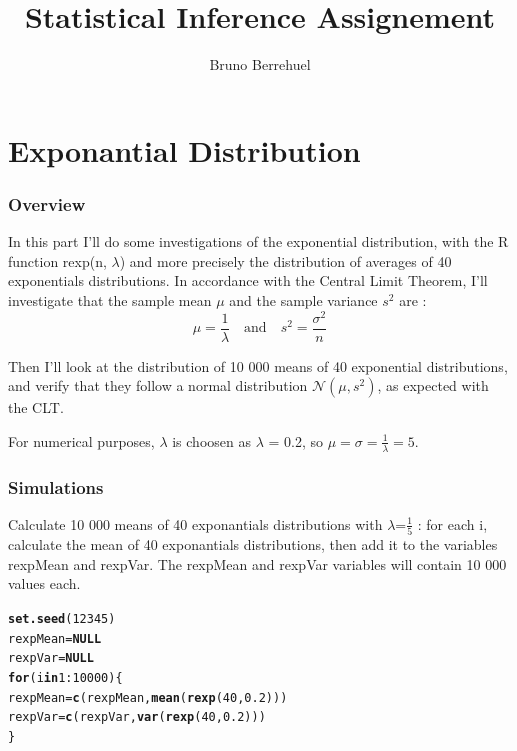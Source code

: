 \documentclass[a4paper, 10pt]{article}\usepackage[]{graphicx}\usepackage[]{color}
\makeatletter
\newcommand{\hlnum}[1]{\textcolor[rgb]{0.686,0.059,0.569}{#1}}%
\newcommand{\hlopt}[1]{\textcolor[rgb]{0,0,0}{#1}}%
\newcommand{\hlstd}[1]{\textcolor[rgb]{0.345,0.345,0.345}{#1}}%
\newcommand{\hlkwa}[1]{\textcolor[rgb]{0.161,0.373,0.58}{\textbf{#1}}}%
\newcommand{\hlkwb}[1]{\textcolor[rgb]{0.69,0.353,0.396}{#1}}%
\newcommand{\hlkwd}[1]{\textcolor[rgb]{0.737,0.353,0.396}{\textbf{#1}}}%
\newenvironment{kframe}{%
 \def\at@end@of@kframe{}%
 \ifinner\ifhmode%
  \def\at@end@of@kframe{\end{minipage}}%
  \begin{minipage}{\columnwidth}%
 \fi\fi%
 \def\FrameCommand##1{\hskip\@totalleftmargin \hskip-\fboxsep
 \colorbox{shadecolor}{##1}\hskip-\fboxsep
     \hskip-\linewidth \hskip-\@totalleftmargin \hskip\columnwidth}%
 \MakeFramed {\advance\hsize-\width
   \@totalleftmargin\z@ \linewidth\hsize
   \@setminipage}}%
 {\par\unskip\endMakeFramed%
 \at@end@of@kframe}
\newenvironment{knitrout}{}{} %
\makeatother
\begin{document}
\title{Statistical Inference Assignement}
\author{Bruno Berrehuel}

\maketitle
\hrulefill{}
\tableofcontents

\makeatletter
{}
\makeatother

\newpage
\part{Exponantial Distribution}
\section{Overview}

In this part I'll do some investigations of the exponential distribution, with the R function rexp(n, $\lambda$) and more precisely the distribution of averages of 40 exponentials distributions.
In accordance with the Central Limit Theorem, I'll investigate that the sample mean $\mu$ and the sample variance $s^2$ are :
\begin{displaymath}
    \mu = \frac{1}{\lambda} \quad\mbox{and}\quad s^2 = \frac{\sigma^2}{n}
\end{displaymath}

Then I'll look at the distribution of 10 000 means of 40 exponential distributions, and verify that they follow a  normal distribution $\mathcal{N}(\mu,s^2)$, as expected with the CLT.

For numerical purposes, $\lambda$ is choosen as $\lambda$ = 0.2, so $\mu = \sigma = \frac{1}{\lambda} = 5$.

\section{Simulations}

Calculate 10 000 means of 40 exponantials distributions with $\lambda$=$\frac{1}{5}$ : for each i, calculate the mean of 40 exponantials distributions, then add it to the variables rexpMean and rexpVar. The rexpMean and rexpVar variables will contain 10 000 values each.

\begin{knitrout}\small
{}\color{fgcolor}\begin{kframe}
\begin{alltt}
\hlkwd{set.seed}\hlstd{(}\hlnum{12345}\hlstd{)}
\hlstd{rexpMean}\hlkwb{=}\hlkwa{NULL}
\hlstd{rexpVar}\hlkwb{=}\hlkwa{NULL}
\hlkwa{for} \hlstd{(i} \hlkwa{in} \hlnum{1}\hlopt{:}\hlnum{10000}\hlstd{) \{}
    \hlstd{rexpMean} \hlkwb{=} \hlkwd{c}\hlstd{(rexpMean,} \hlkwd{mean}\hlstd{(}\hlkwd{rexp}\hlstd{(}\hlnum{40}\hlstd{,}\hlnum{0.2}\hlstd{)))}
    \hlstd{rexpVar} \hlkwb{=} \hlkwd{c}\hlstd{(rexpVar,} \hlkwd{var}\hlstd{(}\hlkwd{rexp}\hlstd{(}\hlnum{40}\hlstd{,}\hlnum{0.2}\hlstd{)))}
\hlstd{\}}
\end{alltt}
\end{kframe}
\end{knitrout}
\end{document}
